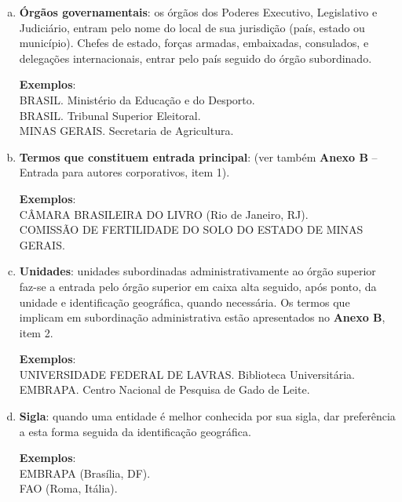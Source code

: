 \begin{enumerate}[a)]
  \item  \textbf{Órgãos governamentais}: os órgãos dos Poderes Executivo, Legislativo e 
   Judiciário, entram pelo nome do local de sua jurisdição (país, estado ou   município). Chefes de estado, forças armadas, embaixadas, consulados, e   delegações internacionais, entrar pelo país seguido do órgão subordinado.
   
\begin{exemplomanuallista}
\textbf{Exemplos}:\\
BRASIL. Ministério da Educação e do Desporto.\\
BRASIL. Tribunal Superior Eleitoral.\\
MINAS GERAIS. Secretaria de Agricultura.
\end{exemplomanuallista}

  \item  \textbf{Termos que constituem entrada principal}: (ver também \textbf{Anexo B} – 
    Entrada para autores corporativos, item 1).
    
\begin{exemplomanuallista}
\textbf{Exemplos}:\\
CÂMARA BRASILEIRA DO LIVRO (Rio de Janeiro, RJ). \\
COMISSÃO DE FERTILIDADE DO SOLO DO ESTADO DE MINAS GERAIS.
\end{exemplomanuallista}

  \item  \textbf{Unidades}: unidades subordinadas administrativamente ao órgão superior faz-se a entrada pelo órgão superior em caixa alta seguido, após ponto, da unidade e identificação geográfica, quando necessária. Os termos que implicam em subordinação administrativa estão apresentados no \textbf{Anexo B}, item 2.
  
\begin{exemplomanuallista}
\textbf{Exemplos}:\\
UNIVERSIDADE FEDERAL DE LAVRAS. Biblioteca Universitária.\\
EMBRAPA. Centro Nacional de Pesquisa de Gado de Leite.
\end{exemplomanuallista}

  \item  \textbf{Sigla}: quando uma entidade é melhor conhecida por sua sigla, dar preferência a esta forma seguida da identificação geográfica.
  
\begin{exemplomanuallista}  
\textbf{Exemplos}:\\
EMBRAPA (Brasília, DF). \\
FAO (Roma, Itália).
\end{exemplomanuallista}
\end{enumerate}

